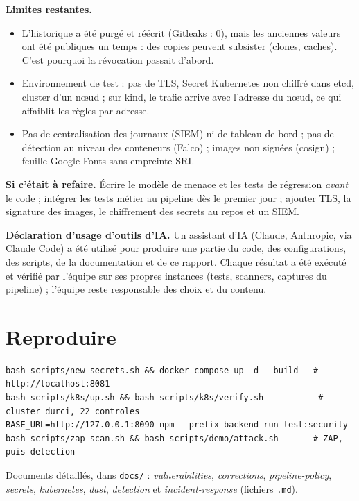 \documentclass[11pt,a4paper]{article}
\newcommand{\code}[1]{\texttt{\small #1}}
\begin{document}
\textbf{Limites restantes.}
\begin{itemize}
  \item L'historique a été purgé et réécrit (Gitleaks : 0), mais les anciennes valeurs ont été publiques
  un temps : des copies peuvent subsister (clones, caches). C'est pourquoi la révocation passait d'abord.
  \item Environnement de test : pas de TLS, Secret Kubernetes non chiffré dans etcd, cluster d'un nœud ;
  sur kind, le trafic arrive avec l'adresse du nœud, ce qui affaiblit les règles par adresse.
  \item Pas de centralisation des journaux (SIEM) ni de tableau de bord ; pas de détection au niveau des
  conteneurs (Falco) ; images non signées (cosign) ; feuille Google Fonts sans empreinte SRI.
\end{itemize}

\textbf{Si c'était à refaire.} Écrire le modèle de menace et les tests de régression \emph{avant} le
code ; intégrer les tests métier au pipeline dès le premier jour ; ajouter TLS, la signature des images,
le chiffrement des secrets au repos et un SIEM.

\textbf{Déclaration d'usage d'outils d'IA.} Un assistant d'IA (Claude, Anthropic, via Claude Code) a été
utilisé pour produire une partie du code, des configurations, des scripts, de la documentation et de ce
rapport. Chaque résultat a été exécuté et vérifié par l'équipe sur ses propres instances (tests,
scanners, captures du pipeline) ; l'équipe reste responsable des choix et du contenu.

\appendix
\section{Reproduire}
{\footnotesize
\begin{verbatim}
bash scripts/new-secrets.sh && docker compose up -d --build   # http://localhost:8081
bash scripts/k8s/up.sh && bash scripts/k8s/verify.sh           # cluster durci, 22 controles
BASE_URL=http://127.0.0.1:8090 npm --prefix backend run test:security
bash scripts/zap-scan.sh && bash scripts/demo/attack.sh       # ZAP, puis detection
\end{verbatim}}
Documents détaillés, dans \code{docs/} : \emph{vulnerabilities}, \emph{corrections}, \emph{pipeline-policy}, \emph{secrets}, \emph{kubernetes}, \emph{dast}, \emph{detection} et \emph{incident-response} (fichiers \code{.md}).
\end{document}
